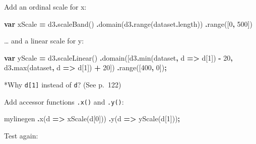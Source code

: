 \documentclass[
  openany]{book}
\newenvironment{Shaded}{\begin{snugshade}}{\end{snugshade}}
\newcommand{\AttributeTok}[1]{\textcolor[rgb]{0.77,0.63,0.00}{#1}}
\newcommand{\DecValTok}[1]{\textcolor[rgb]{0.00,0.00,0.81}{#1}}
\newcommand{\FunctionTok}[1]{\textcolor[rgb]{0.00,0.00,0.00}{#1}}
\newcommand{\KeywordTok}[1]{\textcolor[rgb]{0.13,0.29,0.53}{\textbf{#1}}}
\newcommand{\NormalTok}[1]{#1}
\newcommand{\OperatorTok}[1]{\textcolor[rgb]{0.81,0.36,0.00}{\textbf{#1}}}
\begin{document}
Add an ordinal scale for x:

\begin{Shaded}
\begin{Highlighting}[]
\KeywordTok{var}\NormalTok{ xScale }\OperatorTok{=}\NormalTok{ d3}\OperatorTok{.}\FunctionTok{scaleBand}\NormalTok{()}
    \OperatorTok{.}\FunctionTok{domain}\NormalTok{(d3}\OperatorTok{.}\FunctionTok{range}\NormalTok{(dataset}\OperatorTok{.}\AttributeTok{length}\NormalTok{))}
    \OperatorTok{.}\FunctionTok{range}\NormalTok{([}\DecValTok{0}\OperatorTok{,} \DecValTok{500}\NormalTok{])}
\end{Highlighting}
\end{Shaded}

\ldots{} and a linear scale for y:

\begin{Shaded}
\begin{Highlighting}[]
\KeywordTok{var}\NormalTok{ yScale }\OperatorTok{=}\NormalTok{ d3}\OperatorTok{.}\FunctionTok{scaleLinear}\NormalTok{()}
    \OperatorTok{.}\FunctionTok{domain}\NormalTok{([d3}\OperatorTok{.}\FunctionTok{min}\NormalTok{(dataset}\OperatorTok{,}\NormalTok{ d }\KeywordTok{=\textgreater{}}\NormalTok{ d[}\DecValTok{1}\NormalTok{]) }\OperatorTok{{-}} \DecValTok{20}\OperatorTok{,}
\NormalTok{             d3}\OperatorTok{.}\FunctionTok{max}\NormalTok{(dataset}\OperatorTok{,}\NormalTok{ d }\KeywordTok{=\textgreater{}}\NormalTok{ d[}\DecValTok{1}\NormalTok{]) }\OperatorTok{+} \DecValTok{20}\NormalTok{])}
    \OperatorTok{.}\FunctionTok{range}\NormalTok{([}\DecValTok{400}\OperatorTok{,} \DecValTok{0}\NormalTok{])}\OperatorTok{;}         
\end{Highlighting}
\end{Shaded}

*Why \texttt{d{[}1{]}} instead of \texttt{d}? (See p.~122)

Add accessor functions \texttt{.x()} and \texttt{.y()}:

\begin{Shaded}
\begin{Highlighting}[]
\NormalTok{mylinegen}
    \OperatorTok{.}\FunctionTok{x}\NormalTok{(d }\KeywordTok{=\textgreater{}}\NormalTok{ xScale(d[}\DecValTok{0}\NormalTok{]))}
    \OperatorTok{.}\FunctionTok{y}\NormalTok{(d }\KeywordTok{=\textgreater{}}\NormalTok{ yScale(d[}\DecValTok{1}\NormalTok{]))}\OperatorTok{;}
\end{Highlighting}
\end{Shaded}

Test again:
\end{document}
